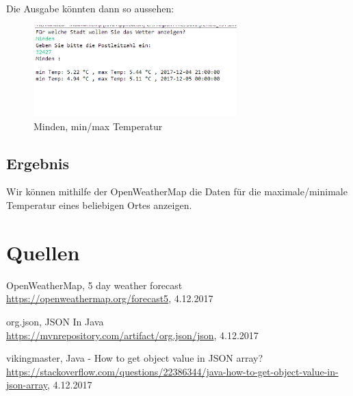 Die Ausgabe könnten dann so aussehen: 

\begin{figure}[htbp]
\begin{center}
\includegraphics[width=0.7\textwidth]{Bild2}
\caption{Minden, min/max Temperatur}
\end{center}
\end{figure}

\subsection{Ergebnis}

Wir können mithilfe der OpenWeatherMap die Daten für die maximale/minimale Temperatur eines beliebigen Ortes anzeigen.

\section{Quellen}
\begin{thebibliography}{999}
 OpenWeatherMap, 5 day weather forecast \\ \url{https://openweathermap.org/forecast5}, 4.12.2017

 org.json, JSON In Java \\ \url{https://mvnrepository.com/artifact/org.json/json}, 4.12.2017

 vikingmaster, Java - How to get object value in JSON array? \\ \url{https://stackoverflow.com/questions/22386344/java-how-to-get-object-value-in-json-array}, 4.12.2017
\end{thebibliography}







